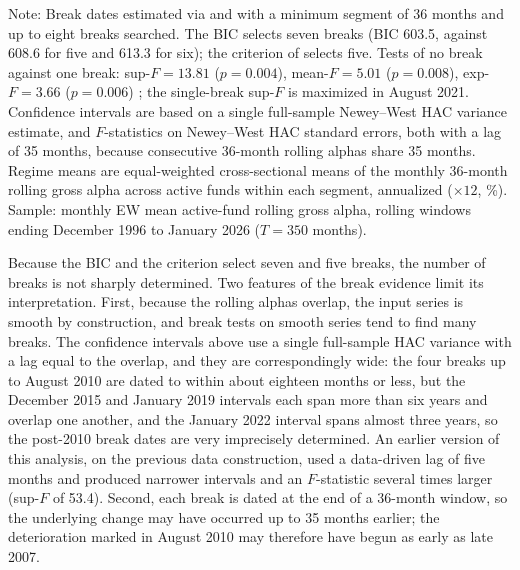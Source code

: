 \documentclass[12pt, oneside]{report}
\newlength{\sbeshrink}
\newif\ifsbemore
\newcommand{\sbefitstep}{%
  \sbemorefalse
  \ifdim\wd\tabletempbox>\linewidth\ifdim\sbeshrink<3pt\sbemoretrue\fi\fi
  \ifsbemore
    \addtolength{\sbeshrink}{0.25pt}\sbox{\tabletempbox}{\sbetab}%
    \expandafter\sbefitstep
  \fi}
\newcommand{\sbefit}{%
  \setlength{\sbeshrink}{0pt}\sbox{\tabletempbox}{\sbetab}%
  \sbefitstep
  \setlength{\sbeshrink}{0pt}}
\newlength{\tabletempwidth}
\newcommand{\tablefont}{\fontsize{9}{11}\selectfont}  %
\begin{document}
\begin{table}[!htbp]
{}\sbefit
\setlength{\tabletempwidth}{\wd\tabletempbox}
\ifdim\tabletempwidth>\linewidth\setlength{\tabletempwidth}{\linewidth}\fi
\begin{minipage}{\tabletempwidth}
\captionsetup{width=\linewidth}
\caption{Bai--Perron Break Dates, 95\,\% HAC Confidence Intervals, and
         Regime-Mean Gross Alpha}
\label{tab:breaktest}
\ifdim\wd\tabletempbox>\linewidth
  \resizebox{\linewidth}{!}{\usebox{\tabletempbox}}
\else
  \usebox{\tabletempbox}
\fi
\par\medskip
\begin{singlespace}\tablefont\noindent
Note: Break dates estimated via \textcite{Bai1998} and
\textcite{Bai2003} with a minimum segment of 36 months and up to eight
breaks searched. The BIC selects seven breaks (BIC 603.5, against 608.6
for five and 613.3 for six); the criterion of \textcite{LiuWuZidek1997}
selects five. Tests of no break against one break: sup-$F = 13.81$
($p = 0.004$), mean-$F = 5.01$ ($p = 0.008$), exp-$F = 3.66$
($p = 0.006$) \parencite{Andrews1993,AndrewsPloberger1994}; the
single-break sup-$F$ is maximized in August 2021. Confidence intervals
are based on a single full-sample Newey--West HAC variance estimate, and
$F$-statistics on Newey--West HAC standard errors, both with a lag of 35
months, because consecutive 36-month rolling alphas share 35 months.
Regime means are equal-weighted cross-sectional means of the monthly
36-month rolling \textcite{Carhart1997} gross alpha across active funds
within each segment, annualized ($\times 12$, \%). Sample: monthly EW
mean active-fund rolling gross alpha, rolling windows ending December
1996 to January 2026 ($T = 350$ months).
\end{singlespace}
\end{minipage}
\end{table}

\noindent Because the BIC and the \textcite{LiuWuZidek1997} criterion
select seven and five breaks, the number of breaks is not sharply
determined. Two features of the break evidence limit its interpretation. First,
because the rolling alphas overlap, the input series is smooth by
construction, and break tests on smooth series tend to find many breaks.
The confidence intervals above use a single full-sample HAC variance
with a lag equal to the overlap, and they are correspondingly wide: the
four breaks up to August 2010 are dated to within about eighteen months
or less, but the December 2015 and January 2019 intervals each span more
than six years and overlap one another, and the January 2022 interval
spans almost three years, so the post-2010 break dates are very
imprecisely determined. An
earlier version of this analysis, on the previous data construction,
used a data-driven lag of five months and produced narrower intervals and an $F$-statistic several times
larger (sup-$F$ of 53.4). Second, each break is dated at the end of a 36-month
window, so the underlying change may have occurred up to 35 months
earlier; the deterioration marked in August 2010 may therefore have begun
as early as late 2007.
\end{document}
